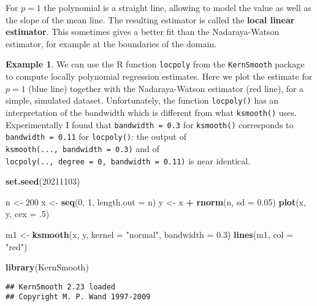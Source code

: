 \documentclass[
  a4paper,
]{article}
\newenvironment{Shaded}{\begin{snugshade}}{\end{snugshade}}
\newcommand{\AttributeTok}[1]{\textcolor[rgb]{0.13,0.29,0.53}{#1}}
\newcommand{\DecValTok}[1]{\textcolor[rgb]{0.00,0.00,0.81}{#1}}
\newcommand{\FloatTok}[1]{\textcolor[rgb]{0.00,0.00,0.81}{#1}}
\newcommand{\FunctionTok}[1]{\textcolor[rgb]{0.13,0.29,0.53}{\textbf{#1}}}
\newcommand{\NormalTok}[1]{#1}
\newcommand{\OtherTok}[1]{\textcolor[rgb]{0.56,0.35,0.01}{#1}}
\newcommand{\SpecialCharTok}[1]{\textcolor[rgb]{0.81,0.36,0.00}{\textbf{#1}}}
\newcommand{\StringTok}[1]{\textcolor[rgb]{0.31,0.60,0.02}{#1}}
\theoremstyle{definition}
\theoremstyle{definition}
\newtheorem{example}{Example}[section]
\theoremstyle{definition}
\theoremstyle{definition}
\theoremstyle{remark}
\begin{document}
For \(p=1\) the polynomial is a straight line, allowing to model the
value as well as the slope of the mean line. The resulting estimator
is called the \textbf{local linear estimator}.
This sometimes gives
a better fit than the Nadaraya-Watson estimator, for example at the boundaries
of the domain.

\begin{example}
We can use the R function \texttt{locpoly} from the \texttt{KernSmooth} package to
compute locally polynomial regression estimates. Here we plot
the estimate for \(p=1\) (blue line) together with the Nadaraya-Watson
estimator (red line), for a simple, simulated dataset.
Unfortunately, the function \texttt{locpoly()} has an interpretation of the bandwidth
which is different from what \texttt{ksmooth()} uses. Experimentally I found
that \texttt{bandwidth\ =\ 0.3} for \texttt{ksmooth()} corresponds to
\texttt{bandwidth\ =\ 0.11} for \texttt{locpoly()}: the output of
\texttt{ksmooth(...,\ bandwidth\ =\ 0.3)}
and of \texttt{locpoly(..,\ degree\ =\ 0,\ bandwidth\ =\ 0.11)} is near identical.

\begin{Shaded}
\begin{Highlighting}[]
\FunctionTok{set.seed}\NormalTok{(}\DecValTok{20211103}\NormalTok{)}

\NormalTok{n }\OtherTok{\textless{}{-}} \DecValTok{200}
\NormalTok{x }\OtherTok{\textless{}{-}} \FunctionTok{seq}\NormalTok{(}\DecValTok{0}\NormalTok{, }\DecValTok{1}\NormalTok{, }\AttributeTok{length.out =}\NormalTok{ n)}
\NormalTok{y }\OtherTok{\textless{}{-}}\NormalTok{ x }\SpecialCharTok{+} \FunctionTok{rnorm}\NormalTok{(n, }\AttributeTok{sd =} \FloatTok{0.05}\NormalTok{)}
\FunctionTok{plot}\NormalTok{(x, y, }\AttributeTok{cex =}\NormalTok{ .}\DecValTok{5}\NormalTok{)}

\NormalTok{m1 }\OtherTok{\textless{}{-}} \FunctionTok{ksmooth}\NormalTok{(x, y, }\AttributeTok{kernel =} \StringTok{"normal"}\NormalTok{, }\AttributeTok{bandwidth =} \FloatTok{0.3}\NormalTok{)}
\FunctionTok{lines}\NormalTok{(m1, }\AttributeTok{col =} \StringTok{"red"}\NormalTok{)}

\FunctionTok{library}\NormalTok{(KernSmooth)}
\end{Highlighting}
\end{Shaded}

\begin{verbatim}
## KernSmooth 2.23 loaded
## Copyright M. P. Wand 1997-2009
\end{verbatim}


\end{example}
\end{document}
